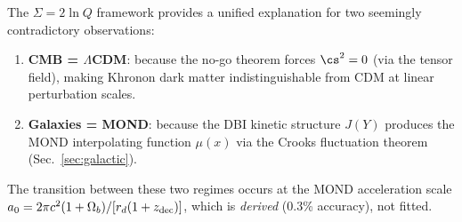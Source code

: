 The $\Sigma = 2\ln Q$ framework provides a unified explanation for
two seemingly contradictory observations:
\begin{enumerate}
\item \textbf{CMB = $\Lambda$CDM}: because the no-go theorem forces
  $\cs^2 = 0$ (via the tensor field), making Khronon dark matter
  indistinguishable from CDM at linear perturbation scales.
\item \textbf{Galaxies = MOND}: because the DBI kinetic structure
  $J(Y)$ produces the MOND interpolating function $\mu(x)$ via the
  Crooks fluctuation theorem (Sec.~\ref{sec:galactic}).
\end{enumerate}

The transition between these two regimes occurs at the MOND
acceleration scale $a_0 = 2\pi c^2(1+\Omega_b)/[r_d(1+z_{\rm dec})]$,
which is \emph{derived} (0.3\% accuracy), not fitted.
